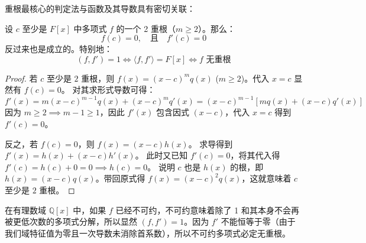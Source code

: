 \documentclass[11pt]{article}
\begin{document}
重根最核心的判定法与函数及其导数具有密切关联：
\begin{cnproperty}[多项式的重根判定]
设 $c$ 至少是 $F[x]$ 中多项式 $f$ 的一个 2 重根（$m \ge 2$）。那么：
$$ f(c) = 0, \quad \text{且} \quad f'(c) = 0 $$
反过来也是成立的。特别地：
$$ (f, f') = 1 \iff \langle f, f' \rangle = F[x] \iff f \text{ 无重根} $$
\end{cnproperty}
\begin{proof}
若 $c$ 至少是 $2$ 重根，则 $f(x) = (x-c)^m q(x)$ ($m \ge 2$)。代入 $x=c$ 显然有 $f(c) = 0$。
对其求形式导数可得：
$$ f'(x) = m(x-c)^{m-1} q(x) + (x-c)^m q'(x) = (x-c)^{m-1} \left[ m q(x) + (x-c) q'(x) \right] $$
因为 $m \ge 2 \implies m-1 \ge 1$，因此 $f'(x)$ 包含因式 $(x-c)$，代入 $x=c$ 得到 $f'(c) = 0$。

反之，若 $f(c) = 0$，则 $f(x) = (x-c) h(x)$。
求导得到 $f'(x) = h(x) + (x-c) h'(x)$。
此时又已知 $f'(c) = 0$，将其代入得 $f'(c) = h(c) + 0 = 0 \implies h(c) = 0$。
说明 $c$ 也是 $h(x)$ 的根，即 $h(x) = (x-c) q(x)$。带回原式得 $f(x) = (x-c)^2 q(x)$，这就意味着 $c$ 至少是 $2$ 重根。
\end{proof}

\begin{cnexample}
在有理数域 $\mathbb{Q}[x]$ 中，如果 $f$ 已经不可约，不可约意味着除了 1 和其本身不会再被更低次数的多项式分解，所以显然 $(f, f')=1$。因为 $f'$ 不能恒等于零（由于我们域特征值为零且一次导数未消除首系数），所以不可约多项式必定无重根。
\end{cnexample}
\end{document}
